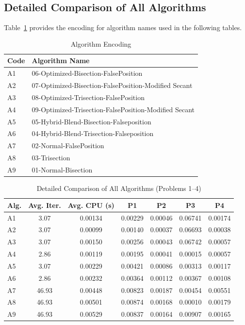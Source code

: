 \documentclass[reprint, amsmath, amssymb, aps, prl]{revtex4-2}
\begin{document}
\subsection{Detailed Comparison of All Algorithms}

Table~\ref{tab:alg_encoding} provides the encoding for algorithm names used in the following tables.

\begin{table}[H]
\centering
\caption{Algorithm Encoding}
\label{tab:alg_encoding}
\begin{tabular}{ll}
\toprule
Code & Algorithm Name \\
\midrule
A1 & 06-Optimized-Bisection-FalsePosition \\
A2 & 07-Optimized-Bisection-FalsePosition-Modified Secant \\
A3 & 08-Optimized-Trisection-FalsePosition \\
A4 & 09-Optimized-Trisection-FalsePosition-Modified Secant \\
A5 & 05-Hybrid-Blend-Bisection-Falseposition \\
A6 & 04-Hybrid-Blend-Trisection-Falseposition \\
A7 & 02-Normal-FalsePosition \\
A8 & 03-Trisection \\
A9 & 01-Normal-Bisection \\
\bottomrule
\end{tabular}
\end{table}

\begin{table}[H]
\centering
\caption{Detailed Comparison of All Algorithms (Problems 1--4)}
\label{tab:detailed_comparison_1}
\begin{tabular}{lcccccc}
\toprule
Alg. & Avg. Iter. & Avg. CPU (s) & P1 & P2 & P3 & P4 \\
\midrule
A1 & 3.07 & 0.00134 & 0.00229 & 0.00046 & 0.06741 & 0.00174 \\
A2 & 3.07 & 0.00099 & 0.00140 & 0.00037 & 0.06693 & 0.00038 \\
A3 & 3.07 & 0.00150 & 0.00256 & 0.00043 & 0.06742 & 0.00057 \\
A4 & 2.86 & 0.00119 & 0.00195 & 0.00041 & 0.00015 & 0.00057 \\
A5 & 3.07 & 0.00229 & 0.00421 & 0.00086 & 0.00313 & 0.00117 \\
A6 & 2.86 & 0.00232 & 0.00364 & 0.00112 & 0.00367 & 0.00108 \\
A7 & 46.93 & 0.00448 & 0.00823 & 0.00187 & 0.00454 & 0.00551 \\
A8 & 46.93 & 0.00501 & 0.00874 & 0.00168 & 0.00010 & 0.00179 \\
A9 & 46.93 & 0.00529 & 0.00837 & 0.00164 & 0.00907 & 0.00165 \\
\bottomrule
\end{tabular}
\end{table}
\end{document}
